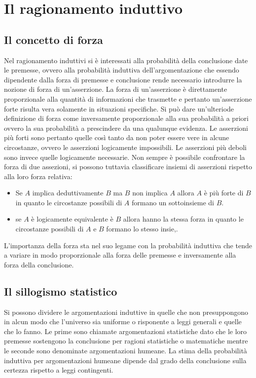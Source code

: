 \chapter{Il ragionamento induttivo}
\section{Il concetto di forza}
Nel ragionamento induttivi si \`e interessati alla probabilit\`a della conclusione date le premesse, ovvero alla probabilit\`a induttiva dell'argomentazione
che essendo dipendente dalla forza di premesse e conclusione rende necessario introdurre la nozione di forza di un'asserzione. La forza di un'asserzione
\`e direttamente proporzionale alla quantit\`a di informazioni che trasmette e pertanto un'asserzione forte risulta vera solamente in situazioni specifiche. 
Si pu\`o dare un'ulteriode definizione di forza come inversamente proporzionale alla sua probabilit\`a a priori ovvero la sua probabilit\`a a prescindere
da una qualunque evidenza. Le asserzioni pi\`u forti sono pertanto quelle cos\`i tanto da non poter essere vere in alcune circostanze, ovvero le asserzioni
logicamente impossibili. Le asserzioni pi\`u deboli sono invece quelle logicamente necessarie. Non sempre \`e possibile confrontare la forza di due 
assezioni, si possono tuttavia classificare insiemi di asserzioni rispetto alla loro forza relativa:
\begin{itemize}
\item Se $A$ implica deduttivamente $B$ ma $B$ non implica $A$ allora $A$ \`e pi\`u forte di $B$ in quanto le circostanze possibili di $A$ formano un
sottoinsieme di $B$.
\item se $A$ \`e logicamente equivalente \`e $B$ allora hanno la stessa forza in quanto le circostanze possibili di $A$ e $B$ formano lo stesso insie,. 
\end{itemize}
L'importanza della forza sta nel suo legame con la probabilit\`a induttiva che tende a variare in modo proporzionale alla forza delle premesse e 
inversamente alla forza della conclusione. 
\section{Il sillogismo statistico}
Si possono dividere le argomentazioni induttive in quelle che non presuppongono in alcun modo che l'universo sia uniforme o risponente a leggi generali e 
quelle che lo fanno. Le prime sono chiamate argomentazioni statistiche dato che le loro premesse sostengono la conclusione per ragioni statistiche o 
matematiche mentre le seconde sono denominate argomentazioni humeane. La stima della probabilit\`a induttiva per argomentazioni humeane dipende dal grado
della conclusione sulla certezza rispetto a leggi contingenti.
